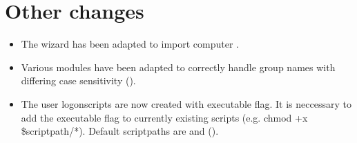 \section{Other changes}
\begin{itemize}
\item The  wizard has been adapted to import  computer .
\item Various  modules have been adapted to correctly handle group names with differing case sensitivity ().
\item The user logonscripts are now created with executable flag.
 It is neccessary to add the executable flag to currently existing scripts (e.g. chmod +x \$scriptpath/*).
 Default scriptpaths are  and  ().
\end{itemize}
